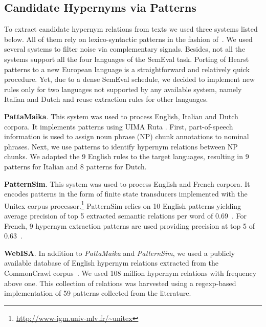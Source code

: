 \documentclass[11pt,letterpaper]{article}
\begin{document}
\subsection{Candidate Hypernyms via Patterns}
\label{sec:step3}
To extract candidate hypernym relations from texts we used three systems listed below. All of them rely on lexico-syntactic patterns in the fashion of~\cite{hearst1992automatic,klaussner2011lexico}. We used several systems to filter noise via complementary signals. Besides, not all the systems support all the four languages of the SemEval task.  Porting of Hearst patterns to a new European language is a straightforward and relatively quick procedure. Yet, due to a dense SemEval schedule, we decided to implement new rules only for two languages not supported by any available system, namely Italian and Dutch and reuse extraction rules for other languages.  


\textbf{PattaMaika}. This system was used to process English, Italian and Dutch corpora. It implements patterns using UIMA Ruta \cite{kluegl2014uima}. First, part-of-speech information is used to assign  noun phrase (NP) chunk annotations to nominal phrases. Next, we use patterns to identify hypernym relations between NP chunks. %
We adapted the 9 English rules to the target languages, resulting in 9 patterns for Italian and 8 patterns for Dutch.


\textbf{PatternSim}. This system was used to process English and French corpora. It encodes patterns in the form of finite state transducers implemented with the Unitex corpus processor.\footnote{\url{http://www-igm.univ-mlv.fr/~unitex}} PatternSim relies on 10 English patterns yielding average precision of top 5 extracted semantic relations per word of 0.69~\cite{panchenko12p}. For French, 9 hypernym extraction patterns are used providing precision at top 5 of 0.63~\cite{panchenko2013recherche}.  


\textbf{WebISA}. In addition to \textit{PattaMaika} and \textit{PatternSim}, we used a publicly available database of English hypernym relations extracted from the CommonCrawl corpus~\cite{webisa2016}. We used 108 million hypernym relations with frequency above one. This collection of relations was harvested using a regexp-based implementation of 59 patterns collected from the literature. %
\end{document}
